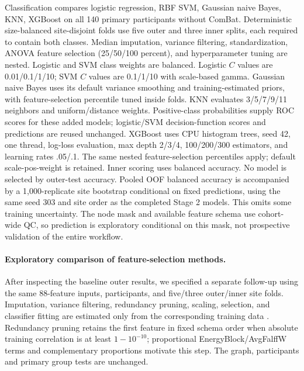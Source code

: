 \documentclass[10pt,letterpaper]{article}
\begin{document}
Classification compares logistic regression, RBF SVM, Gaussian naive Bayes, KNN, XGBoost on all 140 primary
participants without ComBat. Deterministic size-balanced site-disjoint folds use
five outer and three inner splits, each required to contain both classes.
Median imputation, variance filtering, standardization, ANOVA feature selection
(25/50/100 percent), and hyperparameter tuning are nested. Logistic and SVM
class weights are balanced. Logistic $C$ values are 0.01/0.1/1/10; SVM $C$ values
are 0.1/1/10 with scale-based gamma. Gaussian naive Bayes uses its default
variance smoothing and training-estimated priors, with feature-selection percentile
tuned inside folds. KNN evaluates 3/5/7/9/11 neighbors and uniform/distance
weights. Positive-class probabilities supply ROC scores for these added models;
logistic/SVM decision-function scores and predictions are reused unchanged.
XGBoost uses CPU histogram trees, seed 42, one thread, log-loss evaluation,
max depth 2/3/4, 100/200/300 estimators, and learning rates .05/.1. The same
nested feature-selection percentiles apply; default scale-pos-weight is retained.
Inner scoring uses balanced accuracy. No model is selected by outer-test accuracy.
Pooled OOF balanced accuracy is accompanied by a 1,000-replicate site bootstrap
conditional on fixed predictions, using the same seed 303 and site order as the
completed Stage 2 models. This omits some training uncertainty. The node mask and
available feature schema use cohort-wide QC, so prediction is exploratory
conditional on this mask, not prospective validation of the entire workflow.

\paragraph*{Exploratory comparison of feature-selection methods.}
After inspecting the baseline outer results, we specified a separate follow-up
using the same 88-feature inputs, participants, and five/three outer/inner site
folds. Imputation, variance filtering, redundancy pruning, scaling, selection,
and classifier fitting are estimated only from the corresponding training data
\cite{scikit-learn}. Redundancy pruning retains the first feature in fixed schema
order when absolute training correlation is at least $1-10^{-10}$; proportional
EnergyBlock/AvgFalffW terms and complementary proportions motivate this step.
The graph, participants and primary group tests are unchanged.
\end{document}
